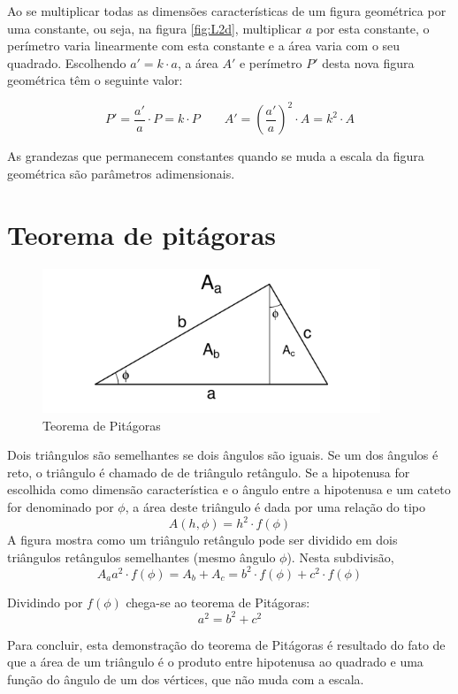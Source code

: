 Ao se multiplicar todas as dimensões características de um figura geométrica por uma constante, ou seja, na figura \ref{fig:L2d}, multiplicar $a$ por esta constante, o perímetro varia linearmente com esta constante e a área varia com o seu quadrado. Escolhendo $a'=k\cdot a$, a área $A'$ e perímetro $P'$ desta nova figura geométrica têm o seguinte valor:

\[
P' = \frac{a'}{a}\cdot P = k\cdot P \qquad A' = \left(\frac{a'}{a}\right)^2\cdot A = k^2\cdot A
\]

As grandezas que permanecem constantes quando se muda a escala da figura geométrica são parâmetros adimensionais.

\section{Teorema de pitágoras}

\begin{figure}
  \centering
  \includegraphics[width=0.9\textwidth]{./figuras/pitagoras}
  \caption{Teorema de Pitágoras}
  \label{fig:pit}
\end{figure}

Dois triângulos são semelhantes se dois ângulos são iguais. Se um dos ângulos é reto, o triângulo é chamado de de triângulo retângulo. Se a hipotenusa for escolhida como dimensão característica e o ângulo entre a hipotenusa e um cateto for denominado por $\phi$, a área deste triângulo é dada por uma relação do tipo
\[
A(h,\phi) = h^2\cdot f(\phi)
\]
A figura mostra como um triângulo retângulo pode ser dividido em dois triângulos retângulos semelhantes (mesmo ângulo $\phi$). Nesta subdivisão, 
\[
A_a a^2\cdot f(\phi) = A_b + A_c = b^2\cdot f(\phi) + c^2\cdot f(\phi)
\]

Dividindo por $f(\phi)$ chega-se ao teorema de Pitágoras:
\[
a^2 = b^2 + c^2
\]

Para concluir, esta demonstração do teorema de Pitágoras é resultado do fato de que a área de um triângulo é o produto entre hipotenusa ao quadrado e uma função do ângulo de um dos vértices, que não muda com a escala.


